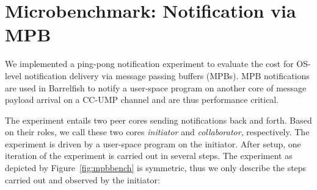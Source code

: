 \documentclass[a4paper,twoside]{report} %
\begin{document}





\section{Microbenchmark: Notification via MPB}\label{sec:mpb_bench}

We implemented a ping-pong notification experiment to evaluate the
cost for OS-level notification delivery via message passing buffers
(MPBs). MPB notifications are used in Barrelfish to notify a
user-space program on another core of message payload arrival on a
CC-UMP channel and are thus performance critical.

The experiment entails two peer cores sending notifications back and
forth. Based on their roles, we call these two cores \emph{initiator}
and \emph{collaborator}, respectively. The experiment is driven by a
user-space program on the initiator. After setup, one iteration of the
experiment is carried out in several steps. The experiment as depicted
by Figure~\ref{fig:mpbbench} is symmetric, thus we only describe the
steps carried out and observed by the initiator:
\end{document}
